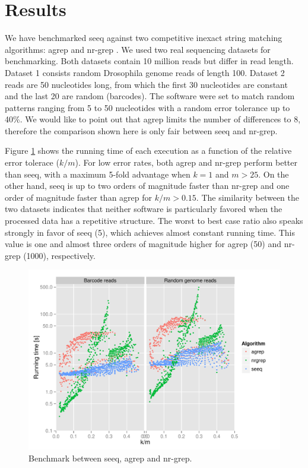 \documentclass{bioinfo}
\begin{document}
\begin{methods}
\end{methods}

\section{Results}

We have benchmarked seeq against two competitive inexact string
matching algorithms: agrep \citep{Wu92} and nr-grep \citep{Nav01}. We
used two real sequencing datasets for benchmarking. Both datasets contain
10 million reads but differ in read length. Dataset 1 consists random
Drosophila genome reads of length 100. Dataset 2 reads are 50
nucleotides long, from which the first 30 nucleotides are constant and
the last 20 are random (barcodes). The software were set to match
random patterns ranging from 5 to 50 nucleotides with a random error
tolerance up to 40\%. We would like to point out that agrep limits the
number of differences to 8, therefore the comparison shown here is
only fair between seeq and nr-grep.

Figure \ref{fig:results} shows the running time of each execution as
a function of the relative error tolerace ($k/m$). For low error
rates, both agrep and nr-grep perform better than seeq, with a maximum
5-fold advantage when $k=1$ and $m > 25$. On the other hand, seeq is
up to two orders of magnitude faster than nr-grep and one order of
magnitude faster than agrep for $k/m > 0.15$. The similarity between
the two datasets indicates that neither software is particularly
favored when the processed data has a repetitive structure. The worst
to best case ratio also speaks strongly in favor of seeq (5), which
achieves almost constant running time. This value is one and almost
three orders of magnitude higher for agrep (50) and nr-grep (1000),
respectively.

\begin{figure}[!tpb]
\centerline{\includegraphics[scale=0.5]{results.pdf}}
\caption{Benchmark between seeq, agrep and nr-grep.}
\label{fig:results}
\end{figure}
\end{document}
